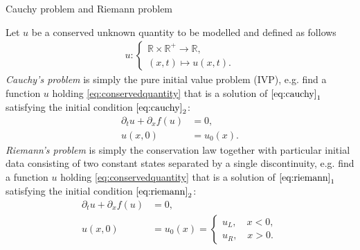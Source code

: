\documentclass[12pt]{article}
\begin{document}
\begin{definition}
	Cauchy problem and Riemann problem
\end{definition}
Let $u$ be a conserved unknown quantity to be modelled and defined as follows
\begin{align}\label{eq:conservedquantity}
	u:
	\begin{cases}
		\mathbb{R}\times\mathbb{R}^+ \rightarrow \mathbb{R}, \\
		(x,t) \mapsto u(x,t).
	\end{cases}
\end{align}
\emph{Cauchy's problem} is simply the pure initial value problem (IVP), e.g. 
find a function $u$ holding \eqref{eq:conservedquantity} that is a solution of
$\eqref{eq:cauchy}_1$ satisfying the initial condition $\eqref{eq:cauchy}_2$:
\begin{equation}\label{eq:cauchy}
	\boxed{
		\begin{aligned}
			\partial_{t}u + \partial_{x}f(u) & = 0,        \\
			u(x,0)                           & = u_{0}(x).
		\end{aligned}
	}
\end{equation}
\emph{Riemann's problem} is simply the conservation law together with particular initial data
consisting of two constant states separated by a single discontinuity, e.g.
find a function $u$ holding \eqref{eq:conservedquantity} that is a solution of
$\eqref{eq:riemann}_1$ satisfying the initial condition $\eqref{eq:riemann}_2$:
\begin{equation}\label{eq:riemann}
	\boxed{
		\begin{aligned}
			\partial_{t}u + \partial_{x}f(u) & = 0,        \\
			u(x,0)                           & = u_{0}(x)=
			\begin{cases}
				u_{L}, \quad x<0, \\
				u_{R}, \quad x>0.
			\end{cases}
		\end{aligned}
	}
\end{equation}
\end{document}
